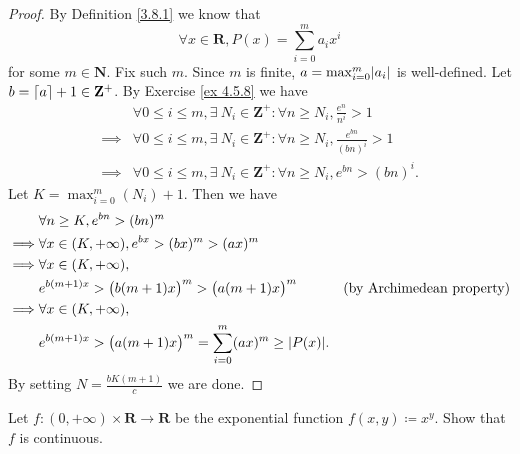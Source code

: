 \begin{proof}
    By Definition \ref{3.8.1} we know that
    \[
        \forall x \in \mathbf{R}, P(x) = \sum_{i = 0}^m a_i x^i
    \]
    for some \(m \in \mathbf{N}\).
    Fix such \(m\).
    Since \(m\) is finite, \(a = \max_{i = 0}^m \abs*{a_i}\) is well-defined.
    Let \(b = \lceil a\rceil + 1 \in \mathbf{Z}^+\).
    By Exercise \ref{ex 4.5.8} we have
    \begin{align*}
                 & \forall 0 \leq i \leq m, \exists\ N_i \in \mathbf{Z}^+ : \forall n \geq N_i, \frac{e^n}{n^i} > 1       \\
        \implies & \forall 0 \leq i \leq m, \exists\ N_i \in \mathbf{Z}^+ : \forall n \geq N_i, \frac{e^{bn}}{(bn)^i} > 1 \\
        \implies & \forall 0 \leq i \leq m, \exists\ N_i \in \mathbf{Z}^+ : \forall n \geq N_i, e^{bn} > (bn)^i.
    \end{align*}
    Let \(K = \max_{i = 0}^m(N_i) + 1\).
    Then we have
    \begin{align*}
                 & \forall n \geq K, e^{bn} > (bn)^m                                                                                      \\
        \implies & \forall x \in (K, +\infty), e^{bx} > (bx)^m > (ax)^m                                                                   \\
        \implies & \forall x \in (K, +\infty),                                                                                            \\
                 & e^{b (m + 1) x} > \big(b (m + 1) x\big)^m > \big(a (m + 1) x\big)^m                 & \text{(by Archimedean property)} \\
        \implies & \forall x \in (K, +\infty),                                                                                            \\
                 & e^{b (m + 1) x} > \big(a (m + 1) x\big)^m = \sum_{i = 0}^m (ax)^m \geq \abs*{P(x)}.
    \end{align*}
    By setting \(N = \frac{b K (m + 1)}{c}\) we are done.
\end{proof}

\begin{exercise}\label{ex 4.5.10}
    Let \(f : (0, +\infty) \times \mathbf{R} \to \mathbf{R}\) be the exponential function \(f(x, y) \coloneqq x^y\).
    Show that \(f\) is continuous.
\end{exercise}

